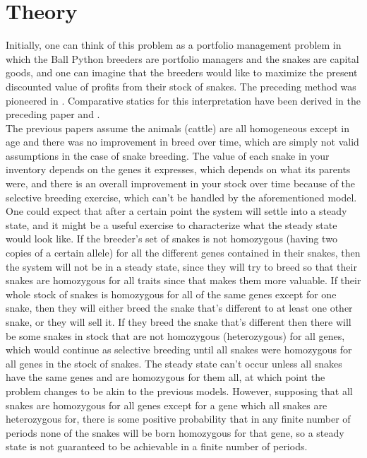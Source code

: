 \documentclass{article}
\begin{document}
	\section*{Theory}
	\indent\indent Initially, one can think of this problem as a portfolio management problem in which the Ball Python breeders are portfolio managers and the snakes are capital goods, and one can imagine that the breeders would like to maximize the present discounted value of profits from their stock of snakes. The preceding method was pioneered in  \cite{jarvis}. Comparative statics for this interpretation have been derived in the preceding paper and \cite{Paarsch}.\\\indent The previous papers assume the animals (cattle) are all homogeneous except in age and there was no improvement in breed over time, which are simply not valid assumptions in the case of snake breeding. The value of each snake in your inventory depends on the genes it expresses, which depends on what its parents were, and there is an overall improvement in your stock over time because of the selective breeding exercise, which can't be handled by the aforementioned model.\\
	\indent One could expect that after a certain point the system will settle into a steady state, and it might be a useful exercise to characterize what the steady state would look like. If the breeder's set of snakes is not homozygous (having two copies of a certain allele) for all the different genes contained in their snakes, then the system will not be in a steady state, since they will try to breed so that their snakes are homozygous for all traits since that makes them more valuable. If their whole stock of snakes is homozygous for all of the same genes except for one snake, then they will either breed the snake that's different to at least one other snake, or they will sell it. If they breed the snake that's different then there will be some snakes in stock that are not homozygous (heterozygous) for all genes, which would continue as selective breeding until all snakes were homozygous for all genes in the stock of snakes. The steady state can't occur unless all snakes have the same genes and are homozygous for them all, at which point the problem changes to be akin to the previous models. However, supposing that all snakes are homozygous for all genes except for a gene which all snakes are heterozygous for, there is some positive probability that in any finite number of periods none of the snakes will be born homozygous for that gene, so a steady state is not guaranteed to be achievable in a finite number of periods.\\
\end{document}
